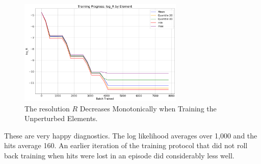 \begin{figure}[hbt!]
\begin{center}
\includegraphics[width=0.7\textwidth]{../figs/search_known/unperturbed/learning_curve_log_R.png}
\end{center}
\caption[The resolution $R$ Decreases Monotonically when Training the Unperturbed Elements]
{The resolution $R$ Decreases Monotonically when Training the Unperturbed Elements.}
\label{fig:TrainUnperturbedRes}
\end{figure}
These are very happy diagnostics.  The log likelihood averages over 1,000 and the hits average 160.
An earlier iteration of the training protocol that did not roll back training when hits were 
lost in an episode did considerably less well.

